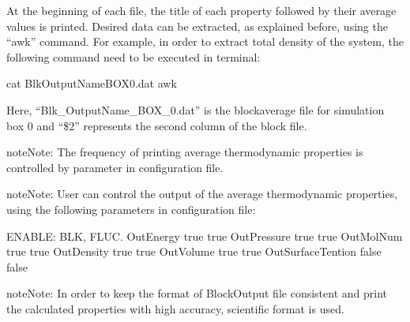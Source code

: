 \documentclass[letterpaper,10pt,english]{sphinxmanual}
\begin{document}
At the beginning of each file, the title of each property followed by their average values is printed.
Desired data can be extracted, as explained before, using the “awk” command. For example, in order to
extract total density of the system, the following command need to be executed in terminal:

\begin{sphinxVerbatim}[commandchars=\\\{\}]
\PYGZdl{} cat Blk\PYGZus{}OutputName\PYGZus{}BOX\PYGZus{}0.dat  awk 
\end{sphinxVerbatim}

Here, “Blk\_OutputName\_BOX\_0.dat” is the block\sphinxhyphen{}average file for simulation box 0 and “\$2” represents the
second column of the block file.

\begin{sphinxadmonition}{note}{Note:}
The frequency of printing average thermodynamic properties is controlled by 
parameter in configuration file.
\end{sphinxadmonition}

\begin{sphinxadmonition}{note}{Note:}
User can control the output of the average thermodynamic properties,  using the following
parameters in configuration file:

\begin{sphinxVerbatim}[commandchars=\\\{\}]
\PYGZsh{}\PYGZsh{}\PYGZsh{}\PYGZsh{}\PYGZsh{}\PYGZsh{}\PYGZsh{}\PYGZsh{}\PYGZsh{}\PYGZsh{}\PYGZsh{}\PYGZsh{}\PYGZsh{}\PYGZsh{}\PYGZsh{}\PYGZsh{}\PYGZsh{}\PYGZsh{}\PYGZsh{}\PYGZsh{}\PYGZsh{}\PYGZsh{}\PYGZsh{}\PYGZsh{}\PYGZsh{}\PYGZsh{}\PYGZsh{}\PYGZsh{}\PYGZsh{}\PYGZsh{}\PYGZsh{}\PYGZsh{}\PYGZsh{}
\PYGZsh{} ENABLE:         BLK, FLUC.
\PYGZsh{}\PYGZsh{}\PYGZsh{}\PYGZsh{}\PYGZsh{}\PYGZsh{}\PYGZsh{}\PYGZsh{}\PYGZsh{}\PYGZsh{}\PYGZsh{}\PYGZsh{}\PYGZsh{}\PYGZsh{}\PYGZsh{}\PYGZsh{}\PYGZsh{}\PYGZsh{}\PYGZsh{}\PYGZsh{}\PYGZsh{}\PYGZsh{}\PYGZsh{}\PYGZsh{}\PYGZsh{}\PYGZsh{}\PYGZsh{}\PYGZsh{}\PYGZsh{}\PYGZsh{}\PYGZsh{}\PYGZsh{}\PYGZsh{}
OutEnergy         true  true
OutPressure       true  true
OutMolNum         true  true
OutDensity        true  true
OutVolume         true  true
OutSurfaceTention false false
\end{sphinxVerbatim}
\end{sphinxadmonition}

\begin{sphinxadmonition}{note}{Note:}
In order to keep the format of BlockOutput file consistent and print the calculated properties
with high accuracy, scientific format is used.
\end{sphinxadmonition}
\end{document}

